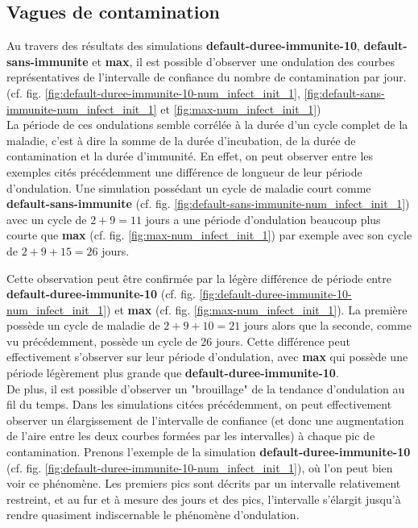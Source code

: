 \documentclass[12pt,french,titlepage]{article}
\begin{document}
\newpage

\subsection{Vagues de contamination}

Au travers des résultats des simulations \textbf{default-duree-immunite-10}, \textbf{default-sans-immunite} et \textbf{max}, il est possible d'observer une ondulation des courbes représentatives de l'intervalle de confiance du nombre de contamination par jour. (cf. fig. \ref{fig:default-duree-immunite-10-num_infect_init_1}, \ref{fig:default-sans-immunite-num_infect_init_1} et \ref{fig:max-num_infect_init_1})\\

La période de ces ondulations semble corrélée à la durée d'un cycle complet de la maladie, c'est à dire la somme de la durée d'incubation, de la durée de contamination et la durée d'immunité. En effet, on peut observer entre les exemples cités précédemment une différence de longueur de leur période d'ondulation. Une simulation possédant un cycle de maladie court comme \textbf{default-sans-immunite} (cf. fig. \ref{fig:default-sans-immunite-num_infect_init_1}) avec un cycle de $2+9 = 11$ jours a une période d'ondulation beaucoup plus courte que \textbf{max} (cf. fig. \ref{fig:max-num_infect_init_1}) par exemple avec son cycle de $2+9+15 = 26$ jours.

Cette observation peut être confirmée par la légère différence de période entre \textbf{default-duree-immunite-10} (cf. fig. \ref{fig:default-duree-immunite-10-num_infect_init_1}) et \textbf{max} (cf. fig. \ref{fig:max-num_infect_init_1}). La première possède un cycle de maladie de $2+9+10 = 21$ jours alors que la seconde, comme vu précédemment, possède un cycle de 26 jours. Cette différence peut effectivement s'observer sur leur période d'ondulation, avec \textbf{max} qui possède une période légèrement plus grande que \textbf{default-duree-immunite-10}.\\

De plus, il est possible d'observer un "brouillage" de la tendance d'ondulation au fil du temps. Dans les simulations citées précédemment, on peut effectivement observer un élargissement de l'intervalle de confiance (et donc une augmentation de l'aire entre les deux courbes formées par les intervalles) à chaque pic de contamination. Prenons l'exemple de la simulation \textbf{default-duree-immunite-10} (cf. fig. \ref{fig:default-duree-immunite-10-num_infect_init_1}), où l'on peut bien voir ce phénomène. Les premiers pics sont décrits par un intervalle relativement restreint, et au fur et à mesure des jours et des pics, l'intervalle s'élargit jusqu'à rendre quasiment indiscernable le phénomène d'ondulation.
\end{document}
